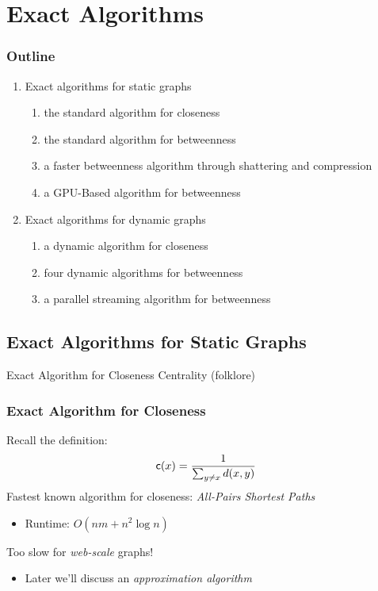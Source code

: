 
\section{Exact Algorithms}
\begin{frame}
  \frametitle{Outline}
  \begin{enumerate}
    \item Exact algorithms for static graphs
      \begin{enumerate}
        \item the standard algorithm for closeness
        \item the standard algorithm for betweenness
        \item a faster betweenness algorithm through shattering and compression
        \item a GPU-Based algorithm for betweenness
      \end{enumerate}
    \item Exact algorithms for dynamic graphs
      \begin{enumerate}
        \item a dynamic algorithm for closeness
        \item four dynamic algorithms for betweenness
        \item a parallel streaming algorithm for betweenness
      \end{enumerate}
  \end{enumerate}
\end{frame}

\subsection{Exact Algorithms for Static Graphs}

\begin{frame}
  \centering
  \vfill
  {\huge Exact Algorithm for Closeness Centrality}
  \vfill
  {\Large(folklore)}
  \vfill
\end{frame}

\begin{frame}
  \frametitle{Exact Algorithm for Closeness}
    \vfill
    Recall the definition:
    \[
      \mathsf{c}(x)=\frac{1}{\sum_{y\neq x}d(x,y)}
    \]
    \vfill
    \pause
    Fastest known algorithm for closeness: \emph{All-Pairs Shortest Paths}
    \begin{itemize}
      \item Runtime: $O(nm+n^2\log n)$
    \end{itemize}
    \vfill
    \pause
    Too slow for \emph{web-scale} graphs!
    \begin{itemize}
      \item Later we'll discuss an \emph{approximation algorithm}
    \end{itemize}
    \vfill
\end{frame}

